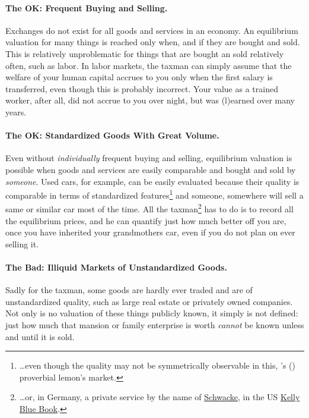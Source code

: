 \paragraph{The OK: Frequent Buying and Selling.} Exchanges do not exist for all goods and services in an economy. An equilibrium valuation for many things is reached only when, and if they are bought and sold. 
This is relatively unproblematic for things that are bought an sold relatively often, such as labor. In labor markets, the taxman can simply assume that the welfare of your human capital accrues to you only when the first salary is transferred, even though this is probably incorrect. Your value as a trained worker, after all, did not accrue to you over night, but was (l)earned over many years. 

\paragraph{The OK: Standardized Goods With Great Volume.} Even without \emph{individually} frequent buying and selling, equilibrium valuation is possible when goods and services are easily comparable and bought and sold by \emph{someone}. Used cars, for example, can be easily evaluated because their quality is comparable in terms of standardized features\footnote{\ldots even though the quality may not be symmetrically observable in this, \citeauthor{Akerlof-1970-aa}'s (\citeyear{Akerlof-1970-aa}) proverbial lemon's market.} and someone, somewhere will sell a same or similar car most of the time. All the taxman\footnote{\ldots or, in Germany, a private service by the name of \href{http://www.schwacke.de/}{Schwacke}, in the US \href{http://www.kbb.com/}{Kelly Blue Book}.} has to do is to record all the equilibrium prices, and he can quantify just how much better off you are, once you have inherited your grandmothers car, even if you do not plan on ever selling it.

\paragraph{The Bad: Illiquid Markets of Unstandardized Goods.} Sadly for the taxman, some goods are hardly ever traded and are of unstandardized quality, such as large real estate or privately owned companies. Not only is no valuation of these things publicly known, it simply is not defined: just how much that mansion or family enterprise is worth \emph{cannot} be known unless and until it is sold. 

